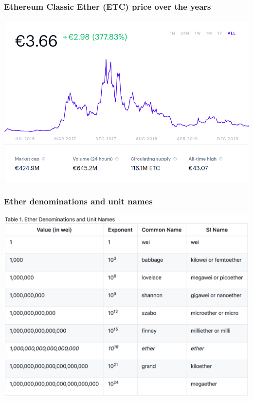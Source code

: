 \documentclass[11pt]{beamer}  %
\begin{document}
\begin{frame}\frametitle{Ethereum Classic Ether (ETC) price over the years}

  \begin{center}
    \includegraphics[scale=0.29,clip=false]{pictures/ethereum-classic.png}
  \end{center}

\end{frame}

\begin{frame}\frametitle{Ether denominations and unit names}

  \begin{center}
    \includegraphics[scale=0.2,clip=false]{pictures/ether-denominations.png}
  \end{center}

\end{frame}
\end{document}
